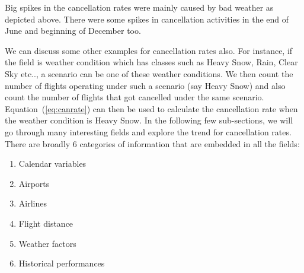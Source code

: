 \documentclass[12pt]{article}
\begin{document}
Big spikes in the cancellation rates were mainly caused by bad weather as depicted above. There were some spikes in cancellation activities in the end of June and beginning of December too.


We can discuss some other examples for cancellation rates also. For instance, if the field is weather condition which has classes such as Heavy Snow, Rain, Clear Sky etc.., a scenario can be one of these weather conditions. We then count the number of flights operating under such a scenario (say Heavy Snow) and also count the number of flights that got cancelled under the same scenario. Equation~(\ref{eq:canrate}) can then be used to calculate the cancellation rate when the weather condition is Heavy Snow. In the following few sub-sections, we will go through many interesting fields and explore the trend for cancellation rates. There are broadly 6 categories of information that are embedded in all the fields: 
\begin{enumerate}
\itemsep0em
\item Calendar variables
\item Airports
\item Airlines
\item Flight distance
\item Weather factors
\item Historical performances 
\end{enumerate}
\end{document}

